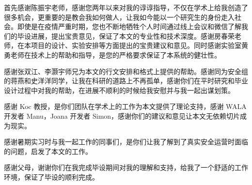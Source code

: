 \documentclass[master]{NJUthesis}
\theoremstyle{plain}
\begin{document}
\begin{thanks}

\vskip 18pt

首先感谢陈振宇老师，感谢您两年以来对我的谆谆指导，不仅在学术上给我创造了很多机会，更重要的是教会我如何做人，让我如今能以一个研究生的身份走入社会。即使是在疫情严重时期，您也不断地牺牲个人时间通过线上会议和微信了解我们的毕设进展，提出宝贵意见，保证了本文的专业性和技术深度。感谢房春荣老师，在本项目的设计、实验安排等方面提出的宝贵建议和意见。同时感谢实验室黄勇老师在技术上的帮助和指导，是您的严格要求保证了本系统的健壮性。

感谢张双江、李灏宇师兄为本文的行文安排和格式上提供的帮助。感谢同为安全组的蒋燕和史洋洋同学，让我在科研的道路上不再孤单，感谢你们在平时研究和毕业设计过程中对我的帮助，在进展不顺利的时候给我安慰并与我一起出谋划策。

感谢 Koc 教授，是你们团队在学术上的工作为本文提供了理论支持，感谢 WALA 开发者 Manu，Joana 开发者 Simon，感谢你们的建议和意见让本文无依赖切片成为现实。

感谢暑期实习时与我一起工作的同事们，是你们让我了解到了真实安全运营时面临的问题，启发了本文的工作。

感谢父母，谢谢你们在我完成毕设期间对我的理解和支持，给我了一个舒适的工作环境，保证了毕设的顺利完成。


\end{thanks}
\end{document}
